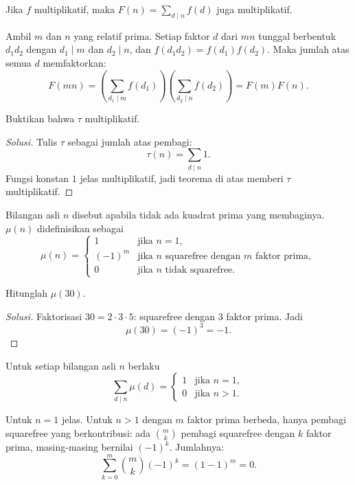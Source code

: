 \documentclass[12pt]{scrartcl}
\begin{document}
\begin{theorem}
Jika $f$ multiplikatif, maka $F(n) = \sum_{d \mid n} f(d)$ juga multiplikatif.
\end{theorem}

Ambil $m$ dan $n$ yang relatif prima.
Setiap faktor $d$ dari $mn$ tunggal berbentuk $d_1 d_2$ dengan $d_1 \mid m$
dan $d_2 \mid n$, dan $f(d_1 d_2) = f(d_1)f(d_2)$.
Maka jumlah atas semua $d$ memfaktorkan:
\[ F(mn) = \left(\sum_{d_1 \mid m} f(d_1)\right)\left(\sum_{d_2 \mid n} f(d_2)\right)
= F(m)F(n). \]

\begin{example}
Buktikan bahwa $\tau$ multiplikatif.
\end{example}
\begin{proof}[Solusi]
Tulis $\tau$ sebagai jumlah atas pembagi:
\[ \tau(n) = \sum_{d \mid n} 1. \]
Fungsi konstan $1$ jelas multiplikatif, jadi teorema di atas memberi
$\tau$ multiplikatif.
\end{proof}

\begin{definition}
Bilangan asli $n$ disebut  apabila tidak ada
kuadrat prima yang membaginya.  $\mu(n)$
didefinisikan sebagai
\[ \mu(n) = \begin{cases}
1 & \text{jika } n = 1, \\
(-1)^m & \text{jika $n$ squarefree dengan $m$ faktor prima}, \\
0 & \text{jika $n$ tidak squarefree}.
\end{cases} \]
\end{definition}

\begin{example}
Hitunglah $\mu(30)$.
\end{example}
\begin{proof}[Solusi]
Faktorisasi $30 = 2 \cdot 3 \cdot 5$: squarefree dengan $3$ faktor prima.
Jadi
\[ \mu(30) = (-1)^3 = -1. \]
\end{proof}

\begin{theorem}
Untuk setiap bilangan asli $n$ berlaku
\[ \sum_{d \mid n} \mu(d) = \begin{cases} 1 & \text{jika } n = 1, \\ 0 & \text{jika } n > 1. \end{cases} \]
\end{theorem}

Untuk $n = 1$ jelas. Untuk $n > 1$ dengan $m$ faktor prima berbeda,
hanya pembagi squarefree yang berkontribusi:
ada $\binom{m}{k}$ pembagi squarefree dengan $k$ faktor prima,
masing-masing bernilai $(-1)^k$. Jumlahnya:
\[ \sum_{k=0}^{m} \binom{m}{k}(-1)^k = (1 - 1)^m = 0. \]
\end{document}
